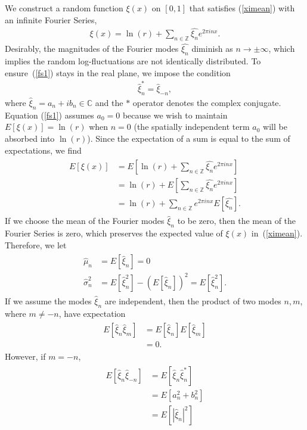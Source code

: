 We construct a random function $\xi(x)$ on $[0,1]$ that satisfies
(\ref{ximean}) with an infinite Fourier Series,
\begin{align}\label{fs1}
\xi(x) = \ln(r) + \sum_{n \in \mathbb{Z}}\hat{\xi_n}e^{2\pi inx}.
\end{align}
Desirably, the magnitudes of the Fourier modes $\hat{\xi_n}$ diminish
as $n \to \pm \infty$, which implies the random log-fluctuations are
not identically distributed. To ensure~(\ref{fs1}) stays in the real plane, we impose the condition
\begin{align}\label{realcond}
\hat{\xi}_{n}^* = \hat{\xi}_{-n},
\end{align}
where $\hat{\xi}_n=a_n + ib_n \in \mathbb{C}$ and the $*$ operator denotes the complex conjugate. Equation (\ref{fs1}) assumes $a_0=0$
because we wish to maintain $E[\xi(x)]=\ln(r)$ when $n=0$ (the
spatially independent term $a_0$ will be absorbed into $\ln(r)$).
Since the expectation of a sum is equal to the sum of
expectations, we find~\cite{ross}
\begin{align*}
\begin{split}
E[\xi(x)] &= E\left[\ln(r) + \sum_{n \in \mathbb{Z}}\hat{\xi_n}e^{2\pi
  inx}\right]\\
&= \ln(r) + E\left[\sum_{n \in \mathbb{Z}}\hat{\xi_n}e^{2\pi inx}\right]\\
&= \ln(r) + \sum_{n \in \mathbb{Z}}e^{2\pi inx}E[\hat{\xi_n}].
\end{split}
\end{align*}
If we choose the mean of the Fourier modes $\hat{\xi}_n$ to be zero,
then the mean of the Fourier Series is zero, which preserves the expected value of $\xi(x)$ in~(\ref{ximean}). Therefore, we let
\begin{align}
\begin{split}\label{xihatmean}
\hat{\mu}_n&=E[\hat{\xi}_n]=0\\
\hat{\sigma}_n^2&=E[\hat{\xi}_n^2]-(E[\hat{\xi}_n])^2=E[\hat{\xi}_n^2].
\end{split}
\end{align}
If we assume the modes $\hat{\xi}_n$ are independent, then the product of
two modes $n,m$, where $m \neq -n$, have expectation
\begin{align*}
\begin{split}
E[\hat{\xi}_n\hat{\xi}_m]&=E[\hat{\xi}_n]E[\hat{\xi}_m]\\
&=0.
\end{split}
\end{align*}
However, if $m=-n$, 
\begin{align*}
\begin{split}
E[\hat{\xi}_n\hat{\xi}_{-n}]&= E[\hat{\xi}_n\hat{\xi}_n^*]\\
&=E[a_n^2+b_n^2]\\
&=E[|\hat{\xi}_n|^2]
\end{split}
\end{align*}
